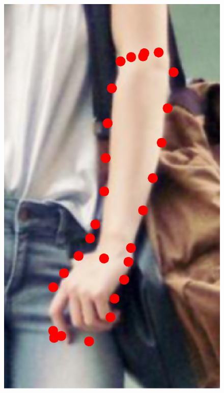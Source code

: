 \begin{figure}[!t]
    \hfill
    \includegraphics[height=\ofh]{resources/Fittings/29.eps}
    \hfill

\end{figure}
